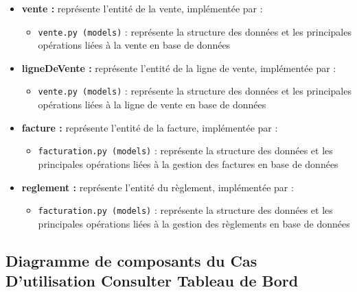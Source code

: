 \begin{itemize}[leftmargin=2em, topsep=4pt, itemsep=4pt]
  \begin{itemize}[leftmargin=2em, topsep=2pt, itemsep=2pt]
    \item \texttt{client.py (models)} : représente la structure des données et les principales opérations liées à la gestion des clients en base de données
  \end{itemize}
  \item \textbf{vente :} représente l'entité de la vente, implémentée par :
  \begin{itemize}[leftmargin=2em, topsep=2pt, itemsep=2pt]
    \item \texttt{vente.py (models)} : représente la structure des données et les principales opérations liées à la vente en base de données
  \end{itemize}
  \item \textbf{ligneDeVente :} représente l'entité de la ligne de vente, implémentée par :
  \begin{itemize}[leftmargin=2em, topsep=2pt, itemsep=2pt]
    \item \texttt{vente.py (models)} : représente la structure des données et les principales opérations liées à la ligne de vente en base de données
  \end{itemize}
  \item \textbf{facture :} représente l'entité de la facture, implémentée par :
  \begin{itemize}[leftmargin=2em, topsep=2pt, itemsep=2pt]
    \item \texttt{facturation.py (models)} : représente la structure des données et les principales opérations liées à la gestion des factures en base de données
  \end{itemize}
  \item \textbf{reglement :} représente l'entité du règlement, implémentée par :
  \begin{itemize}[leftmargin=2em, topsep=2pt, itemsep=2pt]
    \item \texttt{facturation.py (models)} : représente la structure des données et les principales opérations liées à la gestion des règlements en base de données
  \end{itemize}
\end{itemize}
\newpage

\subsection{Diagramme de composants du Cas D'utilisation Consulter Tableau de Bord}

